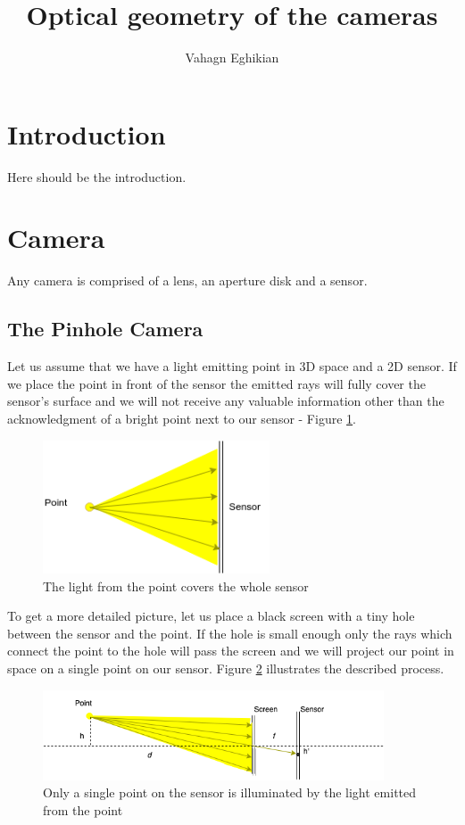 \documentclass[a4paper,10pt]{article}
\title{Optical geometry of the cameras}
\author{Vahagn Eghikian}
\begin{document}
\maketitle

\begin{abstract}

\end{abstract}

\section{Introduction}
Here should be the introduction.
\section{Camera}

Any camera is comprised of a lens, an aperture disk and a sensor. 

\subsection{ The Pinhole Camera}

Let us assume that we have a light emitting point in 3D space and a 2D sensor. If we place the point in front of the sensor the emitted rays  will fully cover the  sensor's surface and we will not receive any valuable information other than the acknowledgment of a bright point next to our sensor -  Figure \ref{fig:point_and_sensor}.

\begin{figure}[h]
\centering
 \includegraphics[width=0.6\textwidth]{../../images/point.png}
 \caption{The light from the point covers the whole sensor}
 \label{fig:point_and_sensor}
\end{figure}

To get a more detailed picture, let us place a black screen with a tiny hole between the sensor and the point. If the hole is small enough only the rays which connect the point to the hole will pass the screen and we will project our point in space on a single point on our sensor.  Figure \ref{fig:pinhole} illustrates the described process. 
\begin{figure}[h]
\centering
 \includegraphics[width=0.9\textwidth]{../../images/pinhole_point.png}
 \caption{Only a single point on the sensor is illuminated by the light emitted from the point}
 \label{fig:pinhole}
\end{figure}
\end{document}
